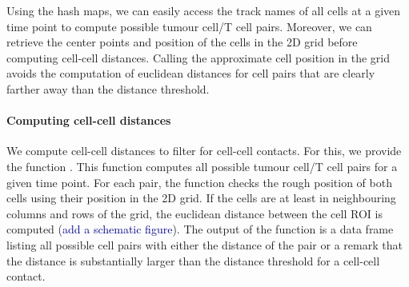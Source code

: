 \documentclass{report}
\begin{document}
Using the hash maps, we can easily access the track names of all cells at a given time point to compute possible tumour cell/T cell pairs. Moreover, we can retrieve the center points and position of the cells in the 2D grid before computing cell-cell distances. Calling the approximate cell position in the grid avoids the computation of euclidean distances for cell pairs that are clearly farther away than the distance threshold. 

%
%	
%	
%	

\paragraph{Computing cell-cell distances}
We compute cell-cell distances to filter for cell-cell contacts. For this, we provide the function . This function computes all possible tumour cell/T cell pairs for a given time point. For each pair, the function checks the rough position of both cells using their position in the 2D grid. If the cells are at least in neighbouring columns and rows of the grid, the euclidean distance between the cell ROI is computed (\textcolor{darkblue}{add a schematic figure}).
The output of the function is a data frame listing all possible cell pairs with either the distance of the pair or a remark that the distance is substantially larger than the distance threshold for a cell-cell contact.
\end{document}
